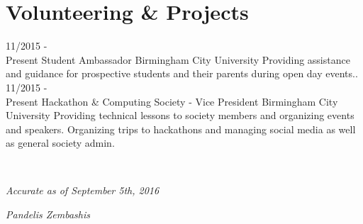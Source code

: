 \documentclass[]{friggeri-cv}
\begin{document}
\section{Volunteering \& Projects}
    \begin{entrylist}
        \entry
    {11/2015 - \\ Present}
    {Student Ambassador }
    {Birmingham City University}
    {Providing assistance and guidance for prospective students and their parents during open day events..\\}
        \entry
    {11/2015 - \\ Present}
    {Hackathon \& Computing Society - Vice President}
    {Birmingham City University}
    {Providing technical lessons to society members and organizing events and speakers.  Organizing trips to hackathons and managing social media as well as general society admin. }
    \end{entrylist}
\\
\begin{flushleft}
\emph{Accurate as of September 5th, 2016}
\end{flushleft}
\begin{flushright}
\emph{Pandelis Zembashis}
\end{flushright}

% 
\end{document}
